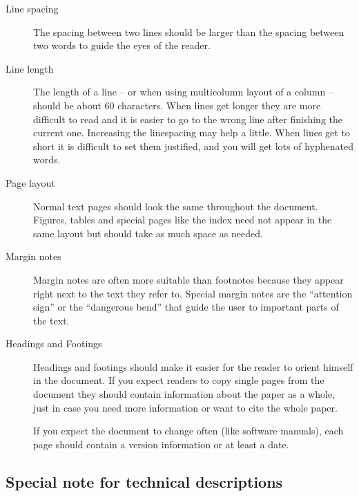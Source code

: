 \documentclass[twoside,a4paper]{refart}
\begin{document}
\begin{description}

\item[Line spacing]
        The spacing between two lines should be larger than the spacing 
        between two words to guide the eyes of the reader.

\item[Line length]
        The length of a line -- or when using multicolumn layout of a 
        column -- should be about 60 characters. When lines get longer they 
        are more difficult to read and it is easier to go to the wrong line 
        after finishing the current one. Increasing the linespacing may help a 
        little.
        When lines get to short it is difficult to set them justified, and you 
        will get lots of hyphenated words.
        
\item[Page layout]
        Normal text pages should look the same throughout the document. 
        Figures, tables and special pages like the index need not appear in 
        the same layout but should take as much space as needed.
        
\item[Margin notes]
        Margin notes are often more suitable than footnotes because they 
        appear right next to the text they refer to. Special margin notes are 
        the ``attention sign'' or the ``dangerous bend'' that guide the user 
        to important parts of the text.
        
\item[Headings and Footings]
        Headings and footings should make it easier for the reader to orient
        himself in the document. If you expect readers to copy single pages
        from the document they should contain information about the paper as
        a whole, just in case you need more information or want to cite the
        whole paper.
        
        If you expect the document to change often (like software manuals),
        each page should contain a version information or at least a date.
        
\end{description}

\subsection{Special note for technical descriptions}
\end{document}
